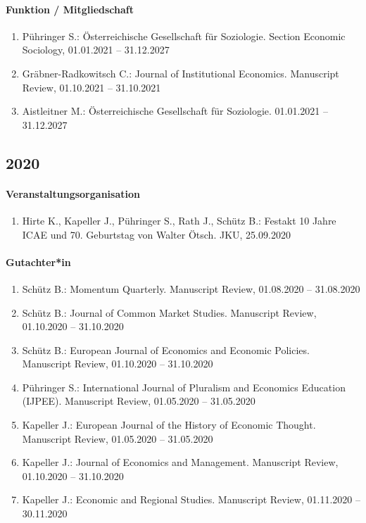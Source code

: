 \paragraph{Funktion / Mitgliedschaft}
\begin{enumerate}[leftmargin=*, labelsep=0.5cm]
\item Pühringer S.: Österreichische Gesellschaft für Soziologie. Section Economic Sociology, 01.01.2021 -- 31.12.2027
\item Gräbner-Radkowitsch C.: Journal of Institutional Economics. Manuscript Review, 01.10.2021 -- 31.10.2021
\item Aistleitner M.: Österreichische Gesellschaft für Soziologie. 01.01.2021 -- 31.12.2027
\end{enumerate}
\subsection*{2020}
\paragraph{Veranstaltungsorganisation}
\begin{enumerate}[leftmargin=*, labelsep=0.5cm]
\item Hirte K., Kapeller J., Pühringer S., Rath J., Schütz B.: Festakt 10 Jahre ICAE und 70. Geburtstag von Walter Ötsch. JKU, 25.09.2020
\end{enumerate}

\paragraph{Gutachter*in}
\begin{enumerate}[leftmargin=*, labelsep=0.5cm]
\item Schütz B.: Momentum Quarterly. Manuscript Review, 01.08.2020 -- 31.08.2020
\item Schütz B.: Journal of Common Market Studies. Manuscript Review, 01.10.2020 -- 31.10.2020
\item Schütz B.: European Journal of Economics and Economic Policies. Manuscript Review, 01.10.2020 -- 31.10.2020
\item Pühringer S.: International Journal of Pluralism and Economics Education (IJPEE). Manuscript Review, 01.05.2020 -- 31.05.2020
\item Kapeller J.: European Journal of the History of Economic Thought. Manuscript Review, 01.05.2020 -- 31.05.2020
\item Kapeller J.: Journal of Economics and Management. Manuscript Review, 01.10.2020 -- 31.10.2020
\item Kapeller J.: Economic and Regional Studies. Manuscript Review, 01.11.2020 -- 30.11.2020
\end{enumerate}

